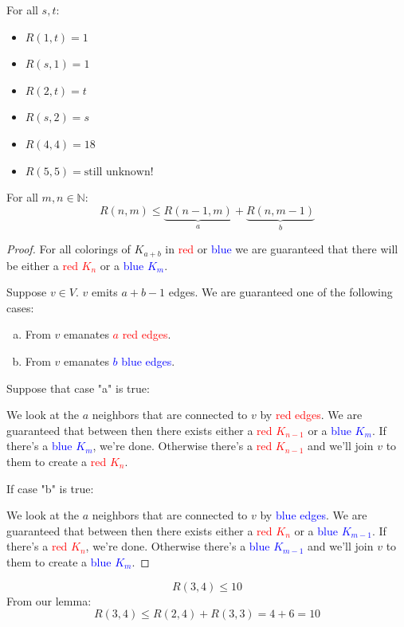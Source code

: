 \documentclass[00_complete]{subfiles}
\begin{document}
For all $s,t$:
\begin{itemize} \tightlist
    \item $R(1,t) = 1$
    \item $R(s,1) = 1$
    \item $R(2,t) = t$
    \item $R(s,2) = s$
    \item $R(4,4) = 18$
    \item $R(5,5) = \text{still unknown!}$
\end{itemize}
\begin{lemma}
    For all $m,n \in \mathbb{N}$:
    $$R(n,m)\leq \underbrace{R(n-1,m)}_{a}+\underbrace{R(n,m-1)}_{b}$$
\end{lemma}
\begin{proof}
    For all colorings of $K_{a+b}$ in \textcolor{red}{red} or
    \textcolor{blue}{blue} we are guaranteed that there will be either a
    \textcolor{red}{red $K_n$} or a \textcolor{blue}{blue $K_m$}.

    Suppose $v \in V$. $v$ emits $a+b-1$ edges. We are guaranteed one of the
    following cases:
    \begin{enumerate}[a.] \tightlist
        \item From $v$ emanates \textcolor{red}{$a$ red edges}.
        \item From $v$ emanates \textcolor{blue}{$b$ blue edges}.
    \end{enumerate}
    Suppose that case "a" is true:

    We look at the $a$ neighbors that are connected to $v$ by
    \textcolor{red}{red edges}. We are guaranteed that between then there
    exists either a \textcolor{red}{red $K_{n-1}$} or a \textcolor{blue}{blue
    $K_m$}. If there's a \textcolor{blue}{blue $K_m$}, we're done. Otherwise
    there's a \textcolor{red}{red $K_{n-1}$} and we'll join $v$ to them to
    create a \textcolor{red}{red $K_{n}$}.

    If case "b" is true:

    We look at the $a$ neighbors that are connected to $v$ by
    \textcolor{blue}{blue edges}. We are guaranteed that between then there
    exists either a \textcolor{red}{red $K_{n}$} or a \textcolor{blue}{blue
    $K_{m-1}$}. If there's a \textcolor{red}{red $K_n$}, we're done. Otherwise
    there's a \textcolor{blue}{blue $K_{m-1}$} and we'll join $v$ to them to
    create a \textcolor{blue}{blue $K_{m}$}.
\end{proof}
\begin{example}
    $$R(3,4) \leq 10$$
    From our lemma:
    $$R(3,4) \leq R(2,4)+R(3,3) = 4+6=10$$
\end{example}
\end{document}
